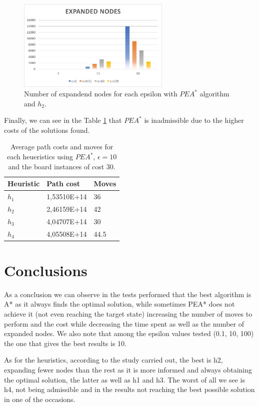 \documentclass[runningheads]{llncs}
\begin{document}
\begin{figure}
    \centering
    \includegraphics[width=0.65\textwidth]{expanded_nodes_PEA.png}
\caption{Number of expandend nodes for each epsilon with $PEA^*$ algorithm and $h_2$.} \label{fig5}
\end{figure}

Finally, we can see in the Table \ref{tab5} that $PEA^*$ is inadmissible due to the higher costs of the solutions found.
\begin{table}
    \centering
    \caption{Average path costs and moves for each heueristics using $PEA^*$, $\epsilon=10$ and the board instances of cost 30.}\label{tab5}
    \begin{tabular}{|l|l|l|}
    \hline
    Heuristic & Path cost & Moves\\
    \hline
    $h_1$ & 1,53510E+14    & 36\\
    $h_2$ & 2,46159E+14    & 42\\
    $h_3$ & 4,04707E+14    & 30\\
    $h_4$ & 4,05508E+14    & 44.5\\
    \hline
    \end{tabular}
\end{table}

\section{Conclusions}
As a conclusion we can observe in the tests performed that the best 
algorithm is A* as it always finds the optimal solution, while sometimes 
PEA* does not achieve it (not even reaching the target state) increasing 
the number of moves to perform and the cost while decreasing the time spent 
as well as the number of expanded nodes. We also note that among the epsilon 
values tested (0.1, 10, 100) the one that gives the best results is 10.

As for the heuristics, according to the study carried out, the best is h2, 
expanding fewer nodes than the rest as it is more informed and always obtaining 
the optimal solution, the latter as well as h1 and h3. The worst of all we 
see is h4, not being admissible and in the results not reaching the best possible 
solution in one of the occasions.
\end{document}
